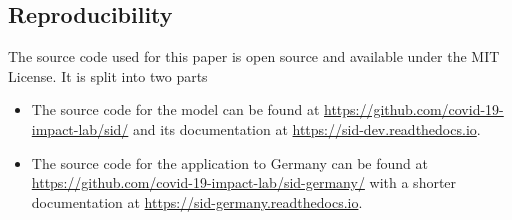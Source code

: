 \subsection{Reproducibility}
\label{subsec:code}

The source code used for this paper is open source and available under the MIT License.
It is split into two parts
\begin{itemize}
    \item The source code for the model can be found at
   \href{https://github.com/covid-19-impact-lab/sid/}{https://github.com/covid-19-impact-lab/sid/}
   and its documentation at
   \href{https://sid-dev.readthedocs.io}{https://sid-dev.readthedocs.io}.
   \item The source code for the application to Germany can be found at
   \href{https://github.com/covid-19-impact-lab/sid-germany/}{https://github.com/covid-19-impact-lab/sid-germany/}
   with a shorter documentation at
   \href{https://sid-germany.readthedocs.io}{https://sid-germany.readthedocs.io}.
\end{itemize} 
